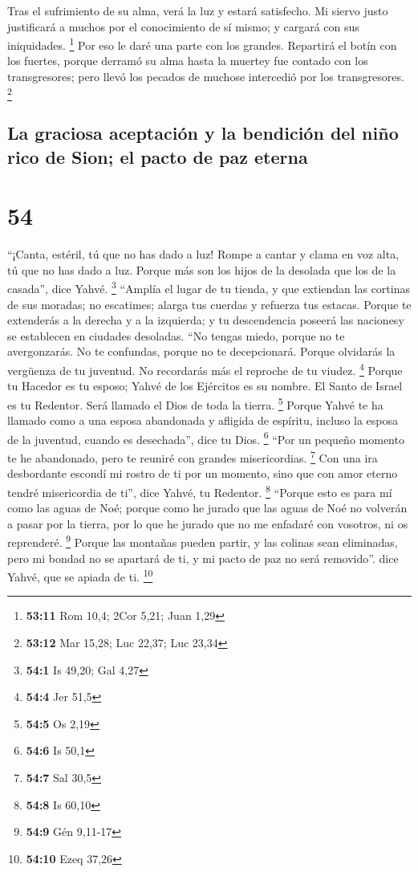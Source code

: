  Tras el sufrimiento de su alma, verá la luz y estará
satisfecho. Mi siervo justo justificará a muchos por el conocimiento de
sí mismo; y cargará con sus iniquidades. \footnote{\textbf{53:11} Rom
  10,4; 2Cor 5,21; Juan 1,29}  Por eso le daré una parte
con los grandes. Repartirá el botín con los fuertes, porque derramó su
alma hasta la muertey fue contado con los transgresores; pero llevó los
pecados de muchose intercedió por los transgresores. \footnote{\textbf{53:12}
  Mar 15,28; Luc 22,37; Luc 23,34}

\hypertarget{la-graciosa-aceptaciuxf3n-y-la-bendiciuxf3n-del-niuxf1o-rico-de-sion-el-pacto-de-paz-eterna}{%
\subsection{La graciosa aceptación y la bendición del niño rico de Sion;
el pacto de paz
eterna}\label{la-graciosa-aceptaciuxf3n-y-la-bendiciuxf3n-del-niuxf1o-rico-de-sion-el-pacto-de-paz-eterna}}

\hypertarget{section-53}{%
\section{54}\label{section-53}}

 ``¡Canta, estéril, tú que no has dado a luz! Rompe a
cantar y clama en voz alta, tú que no has dado a luz. Porque más son los
hijos de la desolada que los de la casada'', dice Yahvé. \footnote{\textbf{54:1}
  Is 49,20; Gal 4,27}  ``Amplía el lugar de tu tienda, y
que extiendan las cortinas de sus moradas; no escatimes; alarga tus
cuerdas y refuerza tus estacas.  Porque te extenderás a la
derecha y a la izquierda; y tu descendencia poseerá las nacionesy se
establecen en ciudades desoladas.  ``No tengas miedo,
porque no te avergonzarás. No te confundas, porque no te decepcionará.
Porque olvidarás la vergüenza de tu juventud. No recordarás más el
reproche de tu viudez. \footnote{\textbf{54:4} Jer 51,5} 
Porque tu Hacedor es tu esposo; Yahvé de los Ejércitos es su nombre. El
Santo de Israel es tu Redentor. Será llamado el Dios de toda la tierra.
\footnote{\textbf{54:5} Os 2,19}  Porque Yahvé te ha
llamado como a una esposa abandonada y afligida de espíritu, incluso la
esposa de la juventud, cuando es desechada'', dice tu Dios. \footnote{\textbf{54:6}
  Is 50,1}  ``Por un pequeño momento te he abandonado,
pero te reuniré con grandes misericordias. \footnote{\textbf{54:7} Sal
  30,5}  Con una ira desbordante escondí mi rostro de ti
por un momento, sino que con amor eterno tendré misericordia de ti'',
dice Yahvé, tu Redentor. \footnote{\textbf{54:8} Is 60,10}
 ``Porque esto es para mí como las aguas de Noé; porque
como he jurado que las aguas de Noé no volverán a pasar por la tierra,
por lo que he jurado que no me enfadaré con vosotros, ni os reprenderé.
\footnote{\textbf{54:9} Gén 9,11-17}  Porque las montañas
pueden partir, y las colinas sean eliminadas, pero mi bondad no se
apartará de ti, y mi pacto de paz no será removido''. dice Yahvé, que se
apiada de ti. \footnote{\textbf{54:10} Ezeq 37,26}

